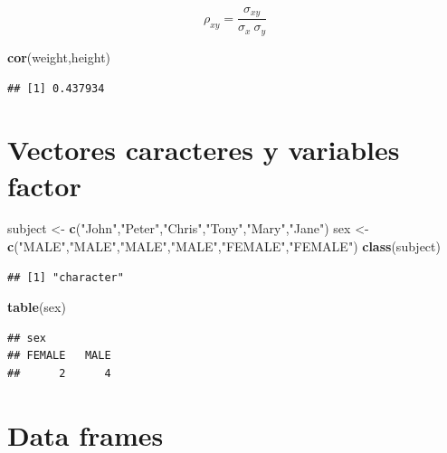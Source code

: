 \documentclass[]{book}
\newenvironment{Shaded}{\begin{snugshade}}{\end{snugshade}}
\newcommand{\KeywordTok}[1]{\textcolor[rgb]{0.13,0.29,0.53}{\textbf{#1}}}
\newcommand{\StringTok}[1]{\textcolor[rgb]{0.31,0.60,0.02}{#1}}
\newcommand{\NormalTok}[1]{#1}
\begin{document}
\[
      \rho_{xy}  = \frac{\sigma_{xy}}{\sigma_x~\sigma_y}
\]

\begin{Shaded}
\begin{Highlighting}[]
\KeywordTok{cor}\NormalTok{(weight,height)}
\end{Highlighting}
\end{Shaded}

\begin{verbatim}
## [1] 0.437934
\end{verbatim}

\section{Vectores caracteres y variables
factor}\label{vectores-caracteres-y-variables-factor}

\begin{Shaded}
\begin{Highlighting}[]
\NormalTok{subject <-}\StringTok{ }\KeywordTok{c}\NormalTok{(}\StringTok{"John"}\NormalTok{,}\StringTok{"Peter"}\NormalTok{,}\StringTok{"Chris"}\NormalTok{,}\StringTok{"Tony"}\NormalTok{,}\StringTok{"Mary"}\NormalTok{,}\StringTok{"Jane"}\NormalTok{)}
\NormalTok{sex <-}\StringTok{ }\KeywordTok{c}\NormalTok{(}\StringTok{"MALE"}\NormalTok{,}\StringTok{"MALE"}\NormalTok{,}\StringTok{"MALE"}\NormalTok{,}\StringTok{"MALE"}\NormalTok{,}\StringTok{"FEMALE"}\NormalTok{,}\StringTok{"FEMALE"}\NormalTok{)}
\KeywordTok{class}\NormalTok{(subject)}
\end{Highlighting}
\end{Shaded}

\begin{verbatim}
## [1] "character"
\end{verbatim}

\begin{Shaded}
\begin{Highlighting}[]
\KeywordTok{table}\NormalTok{(sex)}
\end{Highlighting}
\end{Shaded}

\begin{verbatim}
## sex
## FEMALE   MALE 
##      2      4
\end{verbatim}

\section{Data frames}\label{data-frames}
\end{document}
